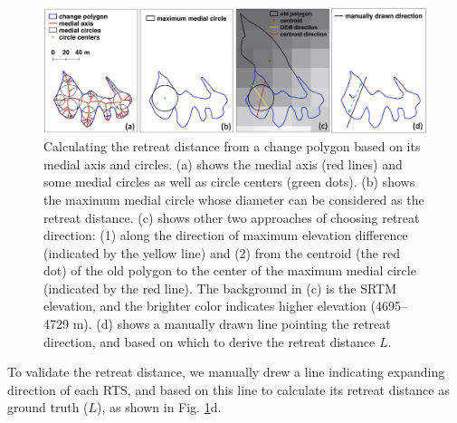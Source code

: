 \documentclass[authoryear,preprint,review,12pt]{elsarticle}
\begin{document}
\begin{figure} 
	\centering
	\includegraphics[width=14cm]{figs/retreat_distance_v2_trim.jpg}
	\caption{Calculating the retreat distance from a change polygon based on its medial axis and circles. (a) shows the medial axis (red lines) and some medial circles as well as circle centers (green dots). (b) shows the maximum medial circle whose diameter can be considered as the retreat distance. (c) shows other two approaches of choosing retreat direction: (1) along the direction of maximum elevation difference (indicated by the yellow line) and (2) from the centroid (the red dot) of the old polygon to the center of the maximum medial circle (indicated by the red line). The background in (c) is the SRTM elevation, and the brighter color indicates higher elevation (4695--4729 m). (d) shows a manually drawn line pointing the retreat direction, and based on which to derive the retreat distance $L$. }
	\label{fig_retreat_dis}
\end{figure}





To validate the retreat distance, we manually drew a line indicating expanding direction of each RTS, and based on this line to calculate its retreat distance as ground truth ($L$), as shown in Fig. \ref{fig_retreat_dis}d. 




\end{document}
